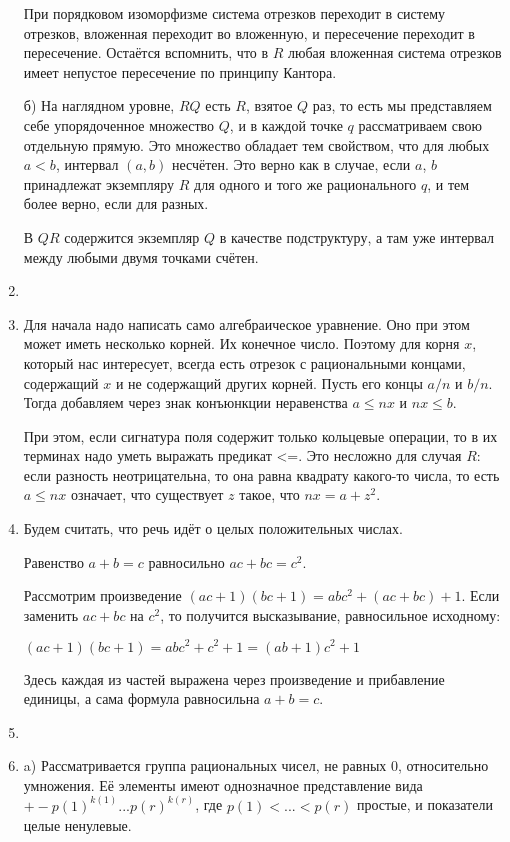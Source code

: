 \documentclass[11pt]{article}
\begin{document}
\begin{enumerate}
		При порядковом изоморфизме система отрезков переходит в систему отрезков, вложенная переходит во вложенную, и пересечение переходит в пересечение. Остаётся вспомнить, что в $R$ любая вложенная система отрезков имеет непустое пересечение по принципу Кантора.
		
		б) На наглядном уровне, $RQ$ есть $R$, взятое $Q$ раз, то есть мы представляем себе упорядоченное множество $Q$, и в каждой точке $q$ рассматриваем свою отдельную прямую. Это множество обладает тем свойством, что для любых $a < b$, интервал $(a,b)$ несчётен. Это верно как в случае, если $a$, $b$ принадлежат экземпляру $R$ для одного и того же рационального $q$, и тем более верно, если для разных.
		
		В $QR$ содержится экземпляр $Q$ в качестве подструктуру, а там уже интервал между любыми двумя точками счётен.
		
		\item 
		\item Для начала надо написать само алгебраическое уравнение. Оно при этом может иметь несколько корней. Их конечное число. Поэтому для корня $x$, который нас интересует, всегда есть отрезок с рациональными концами, содержащий $x$ и не содержащий других корней. Пусть его концы $a/n$ и $b/n$. Тогда добавляем через знак конъюнкции неравенства $a\le nx$ и $nx\le b$.
		
		При этом, если сигнатура поля содержит только кольцевые операции, то в их терминах надо уметь выражать предикат <=. Это несложно для случая $R$: если разность неотрицательна, то она равна квадрату какого-то числа, то есть $a\le nx$ означает, что существует $z$ такое, что $nx=a+z^2$.
		
		\item  
		
		Будем считать, что речь идёт о целых положительных числах.
		
		Равенство $a+b=c$ равносильно $ac+bc=c^2$.
		
		Рассмотрим произведение $(ac+1)(bc+1)=abc^2+(ac+bc)+1$. Если заменить $ac+bc$ на $c^2$, то получится высказывание, равносильное исходному:
		
		$(ac+1)(bc+1)=abc^2+c^2+1=(ab+1)c^2+1$
		
		Здесь каждая из частей выражена через произведение и прибавление единицы, а сама формула равносильна $a+b=c$.
		
		\item 
		\item a) Рассматривается группа рациональных чисел, не равных 0, относительно умножения. Её элементы имеют однозначное представление вида $+-p(1)^{k(1)}...p(r)^{k(r)}$, где $p(1) < ... < p(r)$ простые, и показатели целые ненулевые.
		

\end{enumerate}
\end{document}
